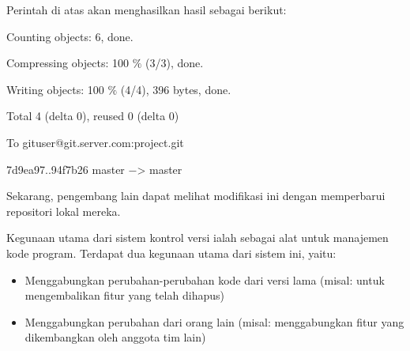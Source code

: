 \vspace{12pt}
\noindent 
Perintah di atas akan menghasilkan hasil sebagai berikut: \par
\noindent 
Counting objects: 6, done. \par
\noindent 
Compressing objects: 100 $  \%  $ (3/3), done. \par
\noindent 
Writing objects: 100 $  \%  $ (4/4), 396 bytes, done. \par
\noindent 
Total 4 (delta 0), reused 0 (delta 0) \par
\noindent 
To gituser@git.server.com:project.git \par
\noindent 
7d9ea97..94f7b26 master  $ - $> master \par
\vspace{12pt}
\hspace*{0.50in} Sekarang, pengembang lain dapat melihat modifikasi ini dengan memperbarui repositori lokal mereka. \par
\hspace*{0.50in}Kegunaan utama dari sistem kontrol versi ialah sebagai alat untuk manajemen kode program. Terdapat dua kegunaan utama dari sistem ini, yaitu: \par
\begin{itemize}
\item Menggabungkan perubahan-perubahan kode dari versi lama (misal: untuk mengembalikan fitur yang telah dihapus)

\item Menggabungkan perubahan dari orang lain (misal: menggabungkan fitur yang dikembangkan oleh anggota tim lain)
\end{itemize}
 
\vspace{12pt}
